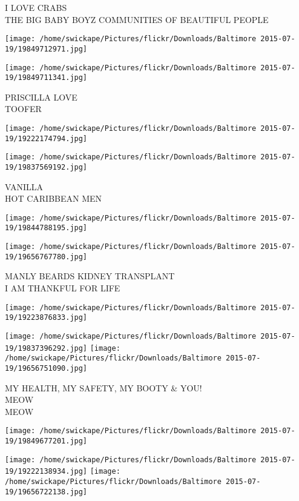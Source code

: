 \documentclass[10pt,letterpaper]{article}
\begin{document}
I LOVE CRABS\\
THE BIG BABY BOYZ COMMUNITIES OF BEAUTIFUL PEOPLE
\pagebreak

\texttt{[image: /home/swickape/Pictures/flickr/Downloads/Baltimore 2015-07-19/19849712971.jpg]}

\vspace{0.25in}
\texttt{[image: /home/swickape/Pictures/flickr/Downloads/Baltimore 2015-07-19/19849711341.jpg]}

PRISCILLA LOVE\\
TOOFER
\pagebreak

\texttt{[image: /home/swickape/Pictures/flickr/Downloads/Baltimore 2015-07-19/19222174794.jpg]}

\vspace{0.25in}
\texttt{[image: /home/swickape/Pictures/flickr/Downloads/Baltimore 2015-07-19/19837569192.jpg]}

VANILLA\\
HOT CARIBBEAN MEN
\pagebreak

\texttt{[image: /home/swickape/Pictures/flickr/Downloads/Baltimore 2015-07-19/19844788195.jpg]}

\vspace{0.25in}
\texttt{[image: /home/swickape/Pictures/flickr/Downloads/Baltimore 2015-07-19/19656767780.jpg]}

MANLY BEARDS KIDNEY TRANSPLANT\\
I AM THANKFUL FOR LIFE
\pagebreak

\texttt{[image: /home/swickape/Pictures/flickr/Downloads/Baltimore 2015-07-19/19223876833.jpg]}

\vspace{0.25in}
\texttt{[image: /home/swickape/Pictures/flickr/Downloads/Baltimore 2015-07-19/19837396292.jpg]}
\texttt{[image: /home/swickape/Pictures/flickr/Downloads/Baltimore 2015-07-19/19656751090.jpg]}

MY HEALTH, MY SAFETY, MY BOOTY \& YOU!\\
MEOW\\
MEOW
\pagebreak

\texttt{[image: /home/swickape/Pictures/flickr/Downloads/Baltimore 2015-07-19/19849677201.jpg]}

\vspace{0.25in}
\texttt{[image: /home/swickape/Pictures/flickr/Downloads/Baltimore 2015-07-19/19222138934.jpg]}
\texttt{[image: /home/swickape/Pictures/flickr/Downloads/Baltimore 2015-07-19/19656722138.jpg]}
\end{document}
